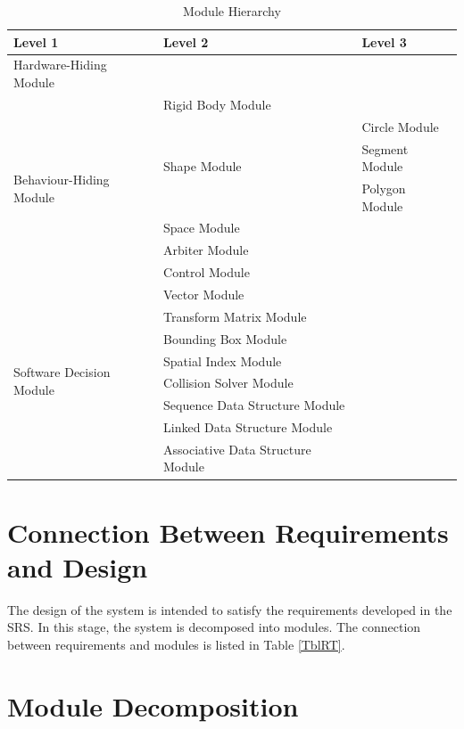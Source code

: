 \documentclass[12pt]{article}
\begin{document}
\begin{table}[h!]
\centering
\begin{tabular}{p{} p{} p{}}
\toprule
\textbf{Level 1} & \textbf{Level 2}  & \textbf{Level 3} \\
\midrule

{Hardware-Hiding Module} & ~ \\
\midrule

\multirow{7}{0.3\textwidth}{Behaviour-Hiding Module} 
& Rigid Body Module \\
& \multirow{3}{0.3\textwidth}{Shape Module} 
& Circle Module \\
& &Segment Module \\
& &Polygon Module \\
& Space Module \\ 
& Arbiter Module \\
& Control Module \\
\midrule
\multirow{8}{0.3\textwidth}{Software Decision Module} 
& Vector Module \\
& Transform Matrix Module \\
& Bounding Box Module \\
& Spatial Index Module \\
& Collision Solver Module \\  
& Sequence Data Structure Module \\  
& Linked Data Structure Module \\  
& Associative Data Structure Module \\  
\bottomrule

\end{tabular}
\caption{Module Hierarchy}
\label{TblMH}
\end{table}

\section{Connection Between Requirements and Design} \label{SecConnection}

The design of the system is intended to satisfy the requirements developed in
the SRS. In this stage, the system is decomposed into modules. The connection
between requirements and modules is listed in Table \ref{TblRT}.

\section{Module Decomposition} \label{SecMD}
\end{document}
